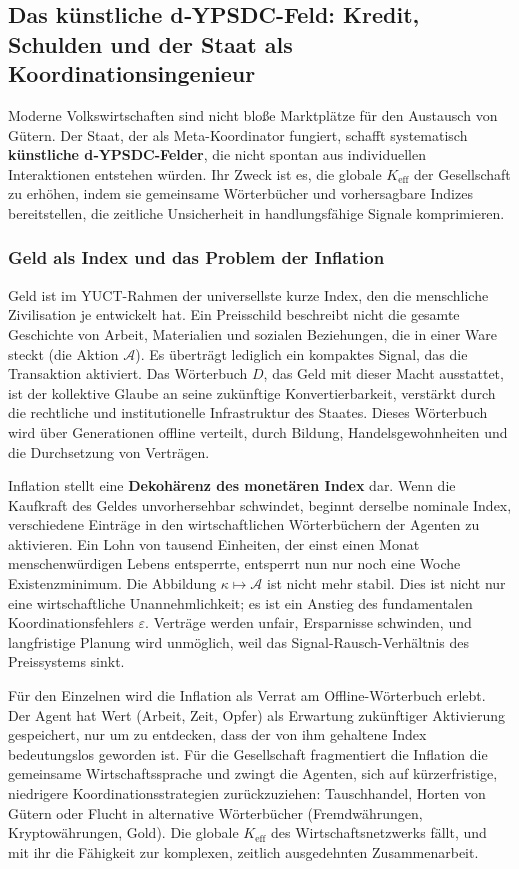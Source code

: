 \documentclass[12pt,a4paper]{article}
\begin{document}
	\subsection{Das künstliche d‑YPSDC-Feld: Kredit, Schulden und der Staat als Koordinationsingenieur}
	
	Moderne Volkswirtschaften sind nicht bloße Marktplätze für den Austausch von Gütern. Der Staat, der als Meta-Koordinator fungiert, schafft systematisch \textbf{künstliche d‑YPSDC-Felder}, die nicht spontan aus individuellen Interaktionen entstehen würden. Ihr Zweck ist es, die globale \(K_{\mathrm{eff}}\) der Gesellschaft zu erhöhen, indem sie gemeinsame Wörterbücher und vorhersagbare Indizes bereitstellen, die zeitliche Unsicherheit in handlungsfähige Signale komprimieren.
	
	\subsubsection{Geld als Index und das Problem der Inflation}
	
	Geld ist im YUCT-Rahmen der universellste kurze Index, den die menschliche Zivilisation je entwickelt hat. Ein Preisschild beschreibt nicht die gesamte Geschichte von Arbeit, Materialien und sozialen Beziehungen, die in einer Ware steckt (die Aktion \(\mathcal{A}\)). Es überträgt lediglich ein kompaktes Signal, das die Transaktion aktiviert. Das Wörterbuch \(D\), das Geld mit dieser Macht ausstattet, ist der kollektive Glaube an seine zukünftige Konvertierbarkeit, verstärkt durch die rechtliche und institutionelle Infrastruktur des Staates. Dieses Wörterbuch wird über Generationen offline verteilt, durch Bildung, Handelsgewohnheiten und die Durchsetzung von Verträgen.
	
	Inflation stellt eine \textbf{Dekohärenz des monetären Index} dar. Wenn die Kaufkraft des Geldes unvorhersehbar schwindet, beginnt derselbe nominale Index, verschiedene Einträge in den wirtschaftlichen Wörterbüchern der Agenten zu aktivieren. Ein Lohn von tausend Einheiten, der einst einen Monat menschenwürdigen Lebens entsperrte, entsperrt nun nur noch eine Woche Existenzminimum. Die Abbildung \(\kappa \mapsto \mathcal{A}\) ist nicht mehr stabil. Dies ist nicht nur eine wirtschaftliche Unannehmlichkeit; es ist ein Anstieg des fundamentalen Koordinationsfehlers \(\varepsilon\). Verträge werden unfair, Ersparnisse schwinden, und langfristige Planung wird unmöglich, weil das Signal-Rausch-Verhältnis des Preissystems sinkt.
	
	Für den Einzelnen wird die Inflation als Verrat am Offline-Wörterbuch erlebt. Der Agent hat Wert (Arbeit, Zeit, Opfer) als Erwartung zukünftiger Aktivierung gespeichert, nur um zu entdecken, dass der von ihm gehaltene Index bedeutungslos geworden ist. Für die Gesellschaft fragmentiert die Inflation die gemeinsame Wirtschaftssprache und zwingt die Agenten, sich auf kürzerfristige, niedrigere Koordinationsstrategien zurückzuziehen: Tauschhandel, Horten von Gütern oder Flucht in alternative Wörterbücher (Fremdwährungen, Kryptowährungen, Gold). Die globale \(K_{\mathrm{eff}}\) des Wirtschaftsnetzwerks fällt, und mit ihr die Fähigkeit zur komplexen, zeitlich ausgedehnten Zusammenarbeit.
	
\end{document}
